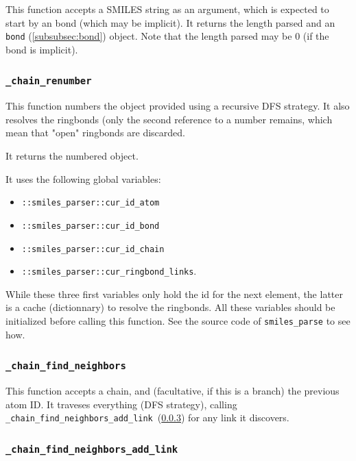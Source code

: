 \documentclass[a4paper, 11pt]{article}
\begin{document}
This function accepts a SMILES string as an argument, which is expected to start by an bond (which may be implicit). It returns the length parsed and an \texttt{bond} (\ref{subsubsec:bond}) object. Note that the length parsed may be 0 (if the bond is implicit).

\subsubsection{\tt \_chain\_renumber}\label{internal:_chain_renumber}

This function numbers the object provided using a recursive DFS strategy. It also resolves the ringbonds (only the second reference to a number remains, which mean that "open" ringbonds are discarded.

It returns the numbered object.

It uses the following global variables:
\begin{itemize}
    \item \texttt{::smiles\_parser::cur\_id\_atom}
    \item \texttt{::smiles\_parser::cur\_id\_bond}
    \item \texttt{::smiles\_parser::cur\_id\_chain}
    \item \texttt{::smiles\_parser::cur\_ringbond\_links}.
\end{itemize}

While these three first variables only hold the id for the next element, the latter is a cache (dictionnary) to resolve the ringbonds. All these variables should be initialized before calling this function. See the source code of \texttt{smiles\_parse} to see how.

\subsubsection{\tt \_chain\_find\_neighbors}\label{internal:_chain_find_neighbors}

This function accepts a chain, and (facultative, if this is a branch) the previous atom ID. It traveses everything (DFS strategy), calling \\{\tt \_chain\_find\_neighbors\_add\_link}~(\ref{internal:_chain_find_neighbors_add_link}) for any link it discovers.

\subsubsection{\tt \_chain\_find\_neighbors\_add\_link}\label{internal:_chain_find_neighbors_add_link}
\end{document}
